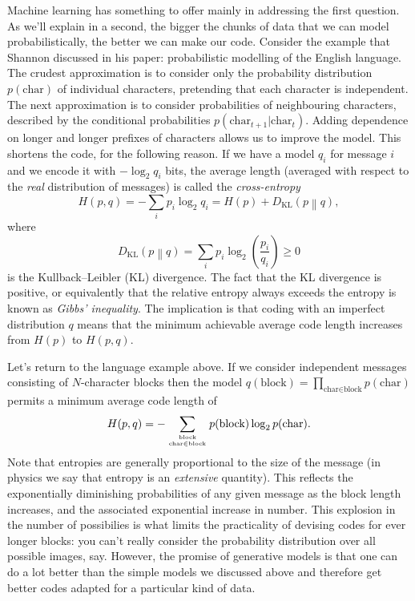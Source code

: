 \documentclass[preprint,notitlepage]{revtex4-1}
\begin{document}
Machine learning has something to offer mainly in addressing the first question. As we'll explain in a second, the bigger the chunks of data that we can model probabilistically, the better we can make our code. Consider the example that Shannon discussed in his paper: probabilistic modelling of the English language. The crudest approximation is to consider only the probability distribution $p(\text{char})$ of individual characters, pretending that each character is independent. The next approximation is to consider probabilities of neighbouring characters, described by the conditional probabilities $p(\text{char}_{t+1}|\text{char}_t)$. Adding dependence on longer and longer prefixes of characters allows us to improve the model. This shortens the code, for the following reason. If we have a model $q_i$ for message $i$ and we encode it with $-\log_2 q_i$ bits, the average length (averaged with respect to the \emph{real} distribution of messages) is called the \emph{cross-entropy}
%
\begin{equation}
  H(p,q)=-\sum_i p_i\log_2 q_i=H(p) + D_{\text{KL}}\left(p \middle\| q\right),
\end{equation}
%
where
%
\begin{equation}
  D_{\text{KL}}\left(p \middle\| q\right) = \sum_i p_i \log_2 \left(\frac{p_i}{q_i}\right)\geq 0
\end{equation}
%
is the Kullback--Leibler (KL) divergence. The fact that the KL divergence is positive, or equivalently that the relative entropy always exceeds the entropy is known as \emph{Gibbs' inequality}. The implication is that coding with an imperfect distribution $q$ means that the minimum achievable average code length increases from $H(p)$ to $H(p,q)$.

Let's return to the language example above. If we consider independent messages consisting of $N$-character blocks then the model $q(\text{block})=\prod_{\text{char}\in\text{block}}p(\text{char})$ permits a minimum average code length of
%
\begin{equation}
  H(p,q)=-\sum_{{\text{block}\atop \text{char}\in\text{block}}} p(\text{block})\log_2 p(\text{char}).
\end{equation}
%
Note that entropies are generally proportional to the size of the message (in physics we say that entropy is an \emph{extensive} quantity). This reflects the exponentially diminishing probabilities of any given message as the block length increases, and the associated exponential increase in number. This explosion in the number of possibilies is what limits the practicality of devising codes for ever longer blocks: you can't really consider the probability distribution over all possible images, say. However, the promise of generative models is that one can do a lot better than the simple models we discussed above and therefore get better codes adapted for a particular kind of data.
\end{document}
